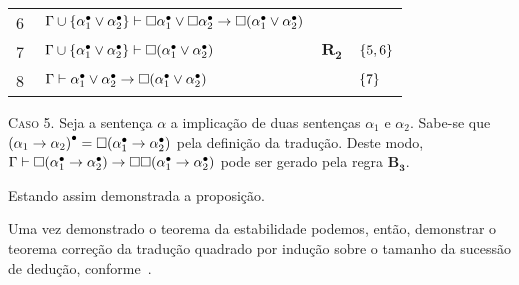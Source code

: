 \begin{tcolorbox}[enhanced jigsaw, breakable, sharp corners, colframe=black, colback=white, boxrule=0.5pt, left=1.5mm, right=1.5mm, top=1.5mm, bottom=1.5mm]
\begin{xltabular}{\textwidth}{r | X l l}
                \scriptsize{\phantom{1}6}\phantom{ } & $\ \Gamma\cup\set{\alpha_1^\bullet\vee\alpha_2^\bullet}\entails\nec\alpha_1^\bullet\vee\nec\alpha_2^\bullet\to\nec(\alpha_1^\bullet\vee\alpha_2^\bullet)$     &  &\\[\rowskip]
                \scriptsize{\phantom{1}7}\phantom{ } & $\ \Gamma\cup\set{\alpha_1^\bullet\vee\alpha_2^\bullet}\entails\nec(\alpha_1^\bullet\vee\alpha_2^\bullet)$                                                              & $\hyperref[modal.rule.2]{\mathbf{R_2}}$         & $\left\{5,6\right\}$\\[\rowskip]
                \scriptsize{\phantom{1}8}\phantom{ } & $\ \Gamma\entails\alpha_1^\bullet\vee\alpha_2^\bullet\to\nec(\alpha_1^\bullet\vee\alpha_2^\bullet)$                                                                     &  & $\left\{7\right\}$
            \end{xltabular}
            \normalsize

            \vspace{.5\baselineskip}
            \textsc{Caso 5.}
            Seja a sentença $\alpha$ a implicação de duas sentenças $\alpha_1$ e $\alpha_2$.
            Sabe-se que ${(\alpha_1\to\alpha_2)}^\bullet=\Box(\alpha_1^\bullet\to\alpha_2^\bullet)$ pela definição da tradução.
            Deste modo, $\Gamma\vdash\Box(\alpha_1^\bullet\to\alpha_2^\bullet)\to\Box\Box(\alpha_1^\bullet\to\alpha_2^\bullet)$ pode ser gerado pela regra \hyperref[modal.axiom.modal.3]{$\mathbf{B_3}$}.

            \vspace{.5\baselineskip}
            Estando assim demonstrada a proposição.
    \end{tcolorbox}

    \vspace{.5\baselineskip}
    Uma vez demonstrado o teorema da estabilidade podemos, então, demonstrar o teorema correção da tradução quadrado por indução sobre o tamanho da sucessão de dedução, conforme~\cite{Troelstra+Schwichtenberg.2000}.

